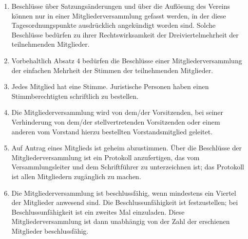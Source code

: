 \documentclass[a4paper]{article}
\begin{document}
\begin{enumerate}
	\item Beschlüsse über Satzungsänderungen und über die Auflösung des Vereins können nur in einer Mitgliederversammlung gefasst werden, in der diese Tagesordnungspunkte ausdrücklich angekündigt worden sind. Solche Beschlüsse bedürfen zu ihrer Rechtswirksamkeit der Dreiviertelmehrheit der teilnehmenden Mitglieder.
	
	\item Vorbehaltlich Absatz 4 bedürfen die Beschlüsse einer Mitgliederversammlung der einfachen Mehrheit der Stimmen der teilnehmenden Mitglieder.
	
	\item Jedes Mitglied hat eine Stimme. Juristische Personen haben einen Stimmberechtigten schriftlich zu bestellen.
	
	\item Die Mitgliederversammlung wird von dem/der Vorsitzenden, bei seiner Verhinderung von dem/der stellvertretenden Vorsitzenden oder einem anderen vom Vorstand hierzu bestellten Vorstandsmitglied geleitet.
	
	\item Auf Antrag eines Mitglieds ist geheim abzustimmen. Über die Beschlüsse der Mitgliederversammlung ist ein Protokoll anzufertigen, das vom Versammlungsleiter und dem Schriftführer zu unterzeichnen ist; das Protokoll ist allen Mitgliedern zugänglich zu machen.

	\item Die Mitgliederversammlung ist beschlussfähig, wenn mindestens ein Viertel der Mitglieder anwesend sind. Die Beschlussunfähigkeit ist festzustellen; bei Beschlussunfähigkeit ist ein zweites Mal einzuladen. Diese Mitgliederversammlung ist dann unabhängig von der Zahl der erschienen Mitglieder beschlussfähig.
\end{enumerate}
\end{document}
